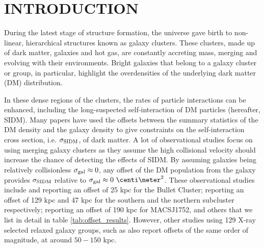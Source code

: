 

\section{INTRODUCTION} 
During the latest stage of structure formation, the universe gave birth to
non-linear, hierarchical structures known as galaxy clusters. 
These clusters, made up of dark matter, galaxies and hot gas,
are constantly accreting mass, merging and evolving with their
environments. Bright galaxies that belong to a galaxy cluster or group, in 
particular, highlight the overdensities of the underlying dark matter (DM) 
distribution. 


In these dense regions of the clusters, the rates of particle
interactions can be enhanced, including the long-suspected self-interaction of DM
particles (hereafter, SIDM).  
Many papers have used the offsets between the summary statistics of the DM
density and the galaxy density to give constraints on 
the self-interaction cross
section, i.e. $\sigma_{\rm SIDM}$, of dark matter. 
A lot of observational studies focus on using merging galaxy clusters
as they assume the high collisional velocity should increase the chance
of detecting the effects of SIDM.
By assuming galaxies being relatively collisionless $\sigma_{\rm gal} \approx 0$, 
any offset of the DM population from the galaxy provides $\sigma_{\rm SIDM}$ 
relative to $\sigma_{\rm gal} \approx 0~\centi\meter^2$. 
These observational studies include \cite{Markevitch2004} and \cite{Bradac2006b}  
reporting an offset of 25 kpc for the Bullet Cluster;  
\cite{Dawson2013} reporting an offset of 129 kpc and 47 kpc for the southern
and the northern subcluster respectively;
\cite{Jee2015} reporting an offset of 190 kpc for MACSJ1752, and others that we
list in detail in table \ref{tab:offset_results}.
However, other studies using 129 X-ray selected relaxed galaxy groups, 
such as \cite{George2012a} also report offsets of the same order of magnitude,
at around $50 - 150$ kpc. 

